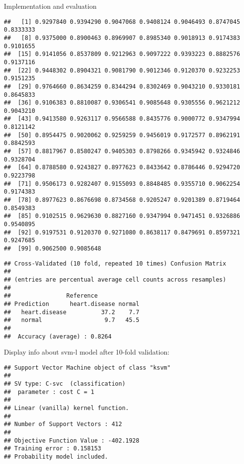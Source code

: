 \documentclass[
  ignorenonframetext,
]{beamer}
\begin{document}
\begin{frame}[fragile]{Implementation and evaluation}
\begin{verbatim}
##   [1] 0.9297840 0.9394290 0.9047068 0.9408124 0.9046493 0.8747045 0.8333333
##   [8] 0.9375000 0.8900463 0.8969907 0.8985340 0.9018913 0.9174383 0.9101655
##  [15] 0.9141056 0.8537809 0.9212963 0.9097222 0.9393223 0.8882576 0.9137116
##  [22] 0.9448302 0.8904321 0.9081790 0.9012346 0.9120370 0.9232253 0.9151235
##  [29] 0.9764660 0.8634259 0.8344294 0.8302469 0.9043210 0.9330181 0.8645833
##  [36] 0.9106383 0.8810087 0.9306541 0.9085648 0.9305556 0.9621212 0.9043210
##  [43] 0.9413580 0.9263117 0.9566588 0.8435776 0.9000772 0.9347994 0.8121142
##  [50] 0.8954475 0.9020062 0.9259259 0.9456019 0.9172577 0.8962191 0.8842593
##  [57] 0.8817967 0.8580247 0.9405303 0.8798266 0.9345942 0.9324846 0.9328704
##  [64] 0.8788580 0.9243827 0.8977623 0.8433642 0.8786446 0.9294720 0.9223798
##  [71] 0.9506173 0.9282407 0.9155093 0.8848485 0.9355710 0.9062254 0.9174383
##  [78] 0.8977623 0.8676698 0.8734568 0.9205247 0.9201389 0.8719464 0.8549383
##  [85] 0.9102515 0.9629630 0.8827160 0.9347994 0.9471451 0.9326886 0.9540895
##  [92] 0.9197531 0.9120370 0.9271080 0.8638117 0.8479691 0.8597321 0.9247685
##  [99] 0.9062500 0.9085648
\end{verbatim}

\begin{verbatim}
## Cross-Validated (10 fold, repeated 10 times) Confusion Matrix 
## 
## (entries are percentual average cell counts across resamples)
##  
##                Reference
## Prediction      heart.disease normal
##   heart.disease          37.2    7.7
##   normal                  9.7   45.5
##                             
##  Accuracy (average) : 0.8264
\end{verbatim}

Display info about svm-l model after 10-fold validation:

\begin{verbatim}
## Support Vector Machine object of class "ksvm" 
## 
## SV type: C-svc  (classification) 
##  parameter : cost C = 1 
## 
## Linear (vanilla) kernel function. 
## 
## Number of Support Vectors : 412 
## 
## Objective Function Value : -402.1928 
## Training error : 0.158153 
## Probability model included.
\end{verbatim}


\end{frame}
\end{document}
